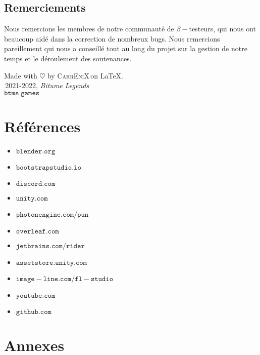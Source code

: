 \documentclass[a4paper,12pt]{article}
\newcommand{\btmlgs}{\textsl{Bitume Legends}}
\newcommand{\CEX}{\textsc{CarrEniX}}
\newcommand{\SITE}{\(\mathtt{btms.games}\)}
\begin{document}
    \subsection{Remerciements}
        Nous remercions les membres de notre communauté de \(\beta-\)testeurs, qui nous ont beaucoup aidé dans la
        correction de nombreux bugs. Nous remercions pareillement  qui nous a conseillé tout au long du projet sur la gestion de notre temps et le déroulement des soutenances.
    
    
    \begin{center}
        Made with $\heartsuit$ by \CEX\,on \LaTeX.\\
        \textcopyright\,2021-2022, \btmlgs\\
        \SITE
    \end{center}

    
    
\section*{Références}
        \begin{itemize}
            \item \(\mathtt{blender.org}\)
            \item \(\mathtt{bootstrapstudio.io}\)
            \item \(\mathtt{discord.com}\)
            \item \(\mathtt{unity.com}\)
            \item \(\mathtt{photonengine.com/pun}\)
            \item \(\mathtt{overleaf.com}\)
            \item \(\mathtt{jetbrains.com/rider}\)
            \item \(\mathtt{assetstore.unity.com}\)
            \item \(\mathtt{image-line.com/fl-studio}\)
            \item \(\mathtt{youtube.com}\)
            \item \(\mathtt{github.com}\)
        \end{itemize}

    \clearpage
    \section*{Annexes}
        \listoftables
        \listoffigures
\end{document}
